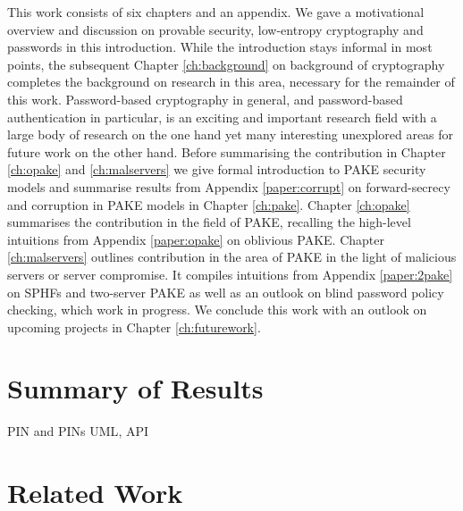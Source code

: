 This work consists of six chapters and an appendix.
We gave a motivational overview and discussion on provable security, low-entropy cryptography and passwords in this introduction.
While the introduction stays informal in most points, the subsequent Chapter \ref{ch:background} on background of cryptography completes the background on research in this area, necessary for the remainder of this work.
Password-based cryptography in general, and password-based authentication in particular, is an exciting and important research field with a large body of research on the one hand yet many interesting unexplored areas for future work on the other hand.
Before summarising the contribution in Chapter \ref{ch:opake} and \ref{ch:malservers} we give formal introduction to \acl{PAKE} security models and summarise results from Appendix \ref{paper:corrupt} on forward-secrecy and corruption in \ac{PAKE} models in Chapter \ref{ch:pake}.
Chapter \ref{ch:opake} summarises the contribution in the field of \acl{PAKE}, \ie recalling the high-level intuitions from Appendix \ref{paper:opake} on oblivious \ac{PAKE}.
Chapter \ref{ch:malservers} outlines contribution in the area of \ac{PAKE} in the light of malicious servers or server compromise.
It compiles intuitions from Appendix \ref{paper:2pake} on \aclp{SPHF} and two-server \ac{PAKE} as well as an outlook on blind password policy checking, which work in progress.
We conclude this work with an outlook on upcoming projects in Chapter \ref{ch:futurework}.


\section{Summary of Results}

\ac{PIN} and \acp{PIN}
\ac{UML}, \ac{API}


\section{Related Work}
